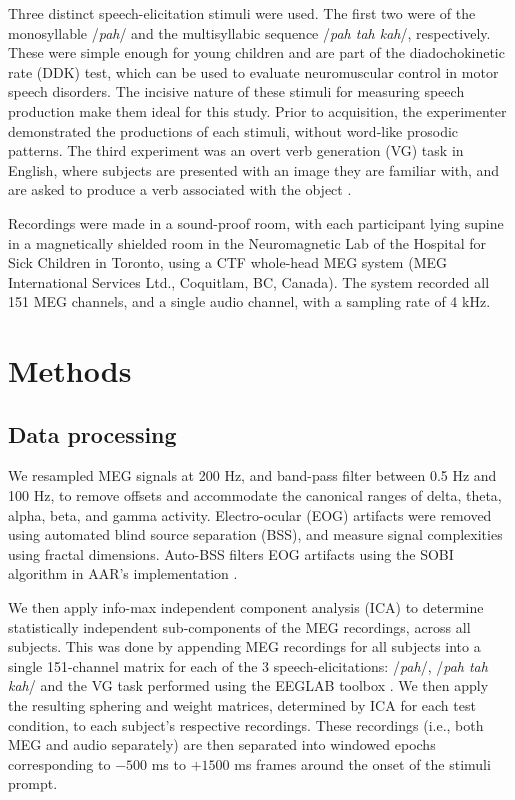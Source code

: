 \documentclass[utf8]{frontiersSCNS} %
\begin{document}
Three distinct speech-elicitation stimuli were used. The first two were of the monosyllable /{\em pah}/ and the multisyllabic sequence /{\em pah tah kah}/, respectively. These were simple enough for young children and are part of the diadochokinetic rate (DDK) test, which can be used to evaluate neuromuscular control in motor speech disorders. The incisive nature of these stimuli for measuring speech production make them ideal for this study. Prior to acquisition, the experimenter demonstrated the productions of each stimuli, without word-like prosodic patterns. The third experiment was an overt verb generation (VG) task in English, where subjects are presented with an image they are familiar with, and are asked to produce a verb associated with the object \cite{Doesburg2016}.

Recordings were made in a sound-proof room, with each participant lying supine in a magnetically shielded room in the Neuromagnetic Lab of the Hospital for Sick Children in Toronto, using a CTF whole-head MEG system (MEG International Services Ltd., Coquitlam, BC, Canada). The system recorded all 151 MEG channels, and a single audio channel, with a sampling rate of 4 kHz.

\section{Methods}


\subsection{Data processing}


We resampled MEG signals at 200 Hz, and band-pass filter between 0.5 Hz and 100 Hz, to remove offsets and accommodate the canonical ranges of delta, theta, alpha, beta, and gamma activity. Electro-ocular (EOG) artifacts were removed using automated blind source separation (BSS), and measure signal complexities using fractal dimensions. Auto-BSS filters EOG artifacts using the SOBI algorithm in AAR's implementation \cite{eog}.

We then apply info-max independent component analysis (ICA) \cite{Bell1995} to determine statistically independent sub-components of the MEG recordings, across all subjects. This was done by appending MEG recordings for all subjects into a single 151-channel matrix for each of the 3 speech-elicitations: /{\em pah}/, /{\em pah tah kah}/ and the VG task performed using the EEGLAB toolbox \cite{Delorme04eeglab}. We then apply the resulting sphering and weight matrices, determined by ICA for each test condition, to each subject's respective recordings. These recordings (i.e., both MEG and audio separately) are then separated into windowed epochs corresponding to $-500$ ms to $+1500$ ms frames around the onset of the stimuli prompt.
\end{document}
